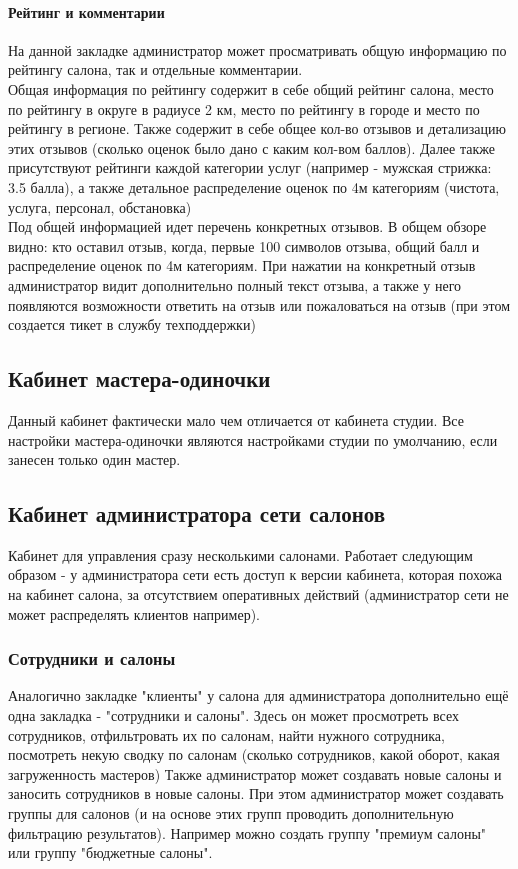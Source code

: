 \documentclass[DIV=calc, paper=a4, fontsize=11pt]{scrartcl} %
\begin{document}
\paragraph{Рейтинг и комментарии}
На данной закладке администратор может просматривать общую информацию по рейтингу салона, так и отдельные комментарии. 
\\[0.5cm]Общая информация по рейтингу содержит в себе общий рейтинг салона, место по рейтингу в округе в радиусе 2 км, место по рейтингу в городе и место по рейтингу в регионе. Также содержит в себе общее кол-во отзывов и детализацию этих отзывов (сколько оценок было дано с каким кол-вом баллов). Далее также присутствуют рейтинги каждой категории услуг (например - мужская стрижка: 3.5 балла), а также детальное распределение оценок по 4м категориям (чистота, услуга, персонал, обстановка)
\\[0.5cm]Под общей информацией идет перечень конкретных отзывов. В общем обзоре видно: кто оставил отзыв, когда, первые 100 символов отзыва, общий балл и распределение оценок по 4м категориям. При нажатии на конкретный отзыв администратор видит дополнительно полный текст отзыва, а также у него появляются возможности ответить на отзыв или пожаловаться на отзыв (при этом создается тикет в службу техподдержки)

\subsection{Кабинет мастера-одиночки}
Данный кабинет фактически мало чем отличается от кабинета студии. Все настройки мастера-одиночки являются настройками студии по умолчанию, если занесен только один мастер.

\subsection{Кабинет администратора сети салонов}
Кабинет для управления сразу несколькими салонами. Работает следующим образом - у администратора сети есть доступ к версии кабинета, которая похожа на кабинет салона, за отсутствием оперативных действий (администратор сети не может распределять клиентов например). 

\subsubsection{Сотрудники и салоны}
Аналогично закладке "клиенты" у салона для администратора дополнительно ещё одна закладка - "сотрудники и салоны". Здесь он может просмотреть всех сотрудников, отфильтровать их по салонам, найти нужного сотрудника, посмотреть некую сводку по салонам (сколько сотрудников, какой оборот, какая загруженность мастеров) 
Также администратор может создавать новые салоны и заносить сотрудников в новые салоны. При этом администратор может создавать группы для салонов (и на основе этих групп проводить дополнительную фильтрацию результатов). Например можно создать группу "премиум салоны" или группу "бюджетные салоны".
\end{document}

